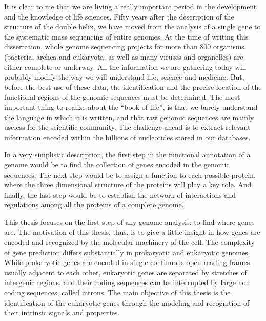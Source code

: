 %
%
%










\clearemptydoublepage




\setcounter{page}{1}
\newpage
{}

It is clear to me that we are living a really important period in the
development and the knowledge of life sciences. Fifty years after the
description of the structure of the double helix, we have moved from
the analysis of a single gene to the systematic mass sequencing of
entire genomes. At the time of writing this dissertation, whole genome
sequencing projects for more than 800 organisms (bacteria, archea and
eukaryota, as well as many viruses and organelles) are either complete
or underway. All the information we are gathering today will probably
modify the way we will understand life, science and medicine. But,
before the best use of these data, the identification and the precise
location of the functional regions of the genomic sequences must be
determined. The most important thing to realize about the ``book of
life'', is that we barely understand the language in which it is
written, and that raw genomic sequences are mainly useless for the
scientific community. The challenge ahead is to extract relevant
information encoded within the billions of nucleotides stored in our
databases.

In a very simplistic description, the first step in the functional
annotation of a genome would be to find the collection of genes
encoded in the genomic sequences. The next step would be to assign a
function to each possible protein, where the three dimensional
structure of the proteins will play a key role. And finally, the last
step would be to establish the network of interactions and regulations
among all the proteins of a complete genome.

This thesis focuses on the first step of any genome analysis: to find
where genes are. The motivation of this thesis, thus, is to give a
little insight in how genes are encoded and recognized by the
molecular machinery of the cell. The complexity of gene prediction
differs substantially in prokaryotic and eukaryotic genomes. While
prokaryotic genes are encoded in single continuous open reading
frames, usually adjacent to each other, eukaryotic genes are separated
by stretches of intergenic regions, and their coding sequences can be
interrupted by large non coding sequences, called introns. The main
objective of this thesis is the identification of the eukaryotic genes
through the modeling and recognition of their intrinsic signals and
properties.

